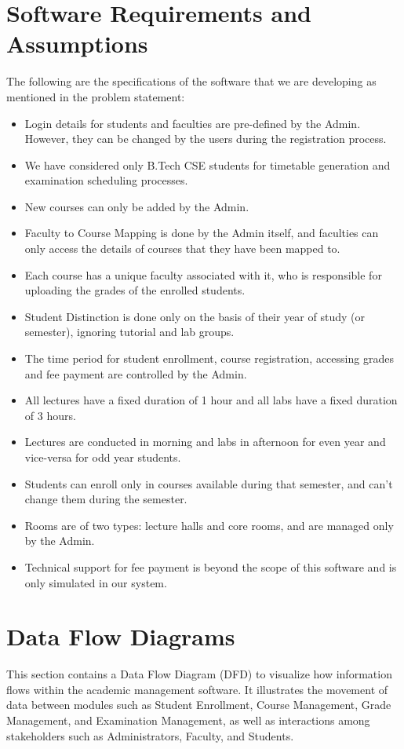 \documentclass[12pt,a4paper]{article}
\begin{document}
\section{Software Requirements and Assumptions}
The following are the specifications of the software that we are developing as mentioned in the problem statement:
\begin{itemize}
    \item Login details for students and faculties are pre-defined by the Admin. However, they can be changed by the users during the registration process.
    \item We have considered only B.Tech CSE students for timetable generation and examination scheduling processes.
    \item New courses can only be added by the Admin.
    \item Faculty to Course Mapping is done by the Admin itself, and faculties can only access the details of courses that they have been mapped to.
    \item Each course has a unique faculty associated with it, who is responsible for uploading the grades of the enrolled students.
    \item Student Distinction is done only on the basis of their year of study (or semester), ignoring tutorial and lab groups.
    \item The time period for student enrollment, course registration, accessing grades and fee payment are controlled by the Admin.
    \item All lectures have a fixed duration of 1 hour and all labs have a fixed duration of 3 hours.
    \item Lectures are conducted in morning and labs in afternoon for even year and vice-versa for odd year students.
    \item Students can enroll only in courses available during that semester, and can't change them during the semester.
    \item Rooms are of two types: lecture halls and core rooms, and are managed only by the Admin.
    \item Technical support for fee payment is beyond the scope of this software and is only simulated in our system.
\end{itemize}

\section{Data Flow Diagrams}
This section contains a Data Flow Diagram (DFD) to visualize how information flows within the academic management software. It illustrates the movement of data between modules such as Student Enrollment, Course Management, Grade Management, and Examination Management, as well as interactions among stakeholders such as Administrators, Faculty, and Students.
\end{document}
